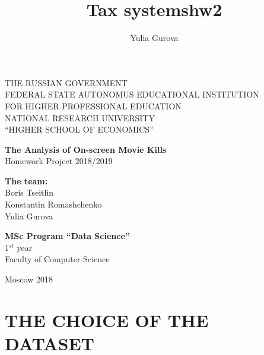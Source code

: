 \documentclass[a4paper,14pt]{article}
\author{Yulia Gurova}
\title{Tax systems}
\title{hw2}
\begin{document}
	\thispagestyle{empty}    %
	
	\begin{center}
		
		
		THE RUSSIAN GOVERNMENT \\
		FEDERAL STATE AUTONOMUS EDUCATIONAL INSTITUTION \\ FOR HIGHER PROFESSIONAL EDUCATION \\ NATIONAL RESEARCH UNIVERSITY \\ ``HIGHER SCHOOL OF ECONOMICS''
		
		\large
		\vspace{2 cm}
	\end{center}
	
	\vspace{2 cm}
	\begin{center}
		\vspace{1 cm} \textbf{The Analysis of On-screen Movie Kills} \\ \vspace{0.5 cm} Homework Project 2018/2019 
		
		
	\end{center}
	
	\vspace{2 cm}
	
	\begin{flushright}
		{ \textbf{The team:} \\ Boris Tseitlin \\ Konstantin Romashchenko \\ Yulia Gurova}
		
		\vspace{1 cm}
		
		{ \textbf{MSc Program “Data Science” } \\ 1$^{st}$ year \\
			Faculty of Computer Science }
	\end{flushright}
	
	\begin{center}
		\vfill
		Moscow 2018	
	\end{center}
	
	\newpage
	\tableofcontents
	\newpage
	
	
	\section{THE CHOICE OF THE DATASET}
\end{document}
